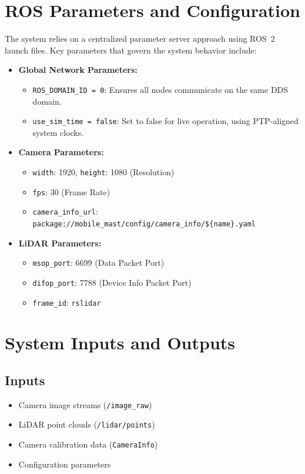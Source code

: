 \documentclass[12pt,a4paper]{report}
\begin{document}
\section{ROS Parameters and Configuration}
The system relies on a centralized parameter server approach using ROS~2 launch files. Key parameters that govern the system behavior include:
\begin{itemize}
    \item \textbf{Global Network Parameters:}
    \begin{itemize}
        \item \texttt{ROS\_DOMAIN\_ID = 0}: Ensures all nodes communicate on the same DDS domain.
        \item \texttt{use\_sim\_time = false}: Set to false for live operation, using PTP-aligned system clocks.
    \end{itemize}
    \item \textbf{Camera Parameters:}
    \begin{itemize}
        \item \texttt{width}: 1920, \texttt{height}: 1080 (Resolution)
        \item \texttt{fps}: 30 (Frame Rate)
        \item \texttt{camera\_info\_url}: \\ \texttt{package://mobile\_mast/config/camera\_info/\$\{name\}.yaml}
    \end{itemize}
    \item \textbf{LiDAR Parameters:}
    \begin{itemize}
        \item \texttt{msop\_port}: 6699 (Data Packet Port)
        \item \texttt{difop\_port}: 7788 (Device Info Packet Port)
        \item \texttt{frame\_id}: \texttt{rslidar}
    \end{itemize}
\end{itemize}


\section{System Inputs and Outputs}

\subsection{Inputs}
\begin{itemize}
    \item Camera image streams (\texttt{/image\_raw})
    \item LiDAR point clouds (\texttt{/lidar/points})
    \item Camera calibration data (\texttt{CameraInfo})
    \item Configuration parameters
\end{itemize}
\end{document}
